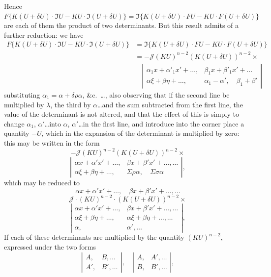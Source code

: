 \documentclass[11pt,a4paper]{article}
\theoremstyle{plain}
\theoremstyle{definition}
\theoremstyle{remark}
\begin{document}
Hence $F\{K(U+\delta U) \cdot \mathfrak{I}U - KU \cdot \mathfrak{I}(U+\delta U)\} = \mathfrak{I}\{K(U+\delta U) \cdot FU - KU \cdot F(U+\delta U)\}$
are each of them the product of two determinants. But this result admits of a further
reduction: we have
\begin{align*}
F\{K(U+\delta U) \cdot \mathfrak{I}U - KU \cdot \mathfrak{I}(U+\delta U)\}
&= \mathfrak{I}\{K(U+\delta U) \cdot FU - KU \cdot F(U+\delta U)\} \tag{58} \\
&= -\mathcal{J}(KU)^{n-2}(K(U+\delta U))^{n-2} \times \\
&\quad\left|\begin{array}{cc}
\alpha_1 x + \alpha'_1 x' + \ldots, & \beta_1 x + \beta'_1 x' + \ldots \\
\alpha\xi + \beta\eta + \ldots, & \alpha_1 - \alpha', \quad \beta_1 + \beta'
\end{array}\right|
\end{align*}
substituting $\alpha_1 = \alpha + \delta\rho\alpha$, \&c.\ \ldots, also observing that if the second line be multiplied
by $\lambda$, the third by $\alpha$\ldots and the sum subtracted from the first line, the value of
the determinant is not altered, and that the effect of this is simply to change
$\alpha_1$, $\alpha'$\ldots into $\alpha$, $\alpha'$\ldots in the first line, and introduce into the corner place a quantity
$-U$, which in the expansion of the determinant is multiplied by zero: this may be
written in the form
\[
-\mathcal{J}(KU)^{n-2}(K(U+\delta U))^{n-2} \times
\]
\[
\left|\begin{array}{cc}
\alpha x + \alpha'x' + \ldots, & \beta x + \beta'x' + \ldots, \ldots \\
\alpha\xi + \beta\eta + \ldots, & \Sigma\rho\alpha, \quad \Sigma\sigma\alpha
\end{array}\right|
\tag{59},
\]
which may be reduced to
\[
\alpha x + \alpha'x'+\ldots, \quad \beta x + \beta'x' + \ldots, \ldots
\]
\[
\mathcal{J}\cdot (KU)^{n-2}\cdot (K(U+\delta U))^{n-2} \times
\]
\[
\left|\begin{array}{cc}
\alpha x + \alpha'x'+\ldots, & \beta x + \beta'x' + \ldots, \ldots \\
\alpha\xi + \beta\eta + \ldots, & \alpha\xi + \beta\eta + \ldots, \ldots \\
\alpha, & \alpha', \ldots
\end{array}\right|
\tag{60},
\]
If each of these determinants are multiplied by the quantity $(KU)^{n-2}$, expressed
under the two forms
\[
\left|\begin{array}{cc}
A, & B, \ldots \\
A', & B', \ldots
\end{array}\right|, \quad
\left|\begin{array}{cc}
A, & A', \ldots \\
B, & B', \ldots
\end{array}\right|
\tag{61},
\]
\end{document}
